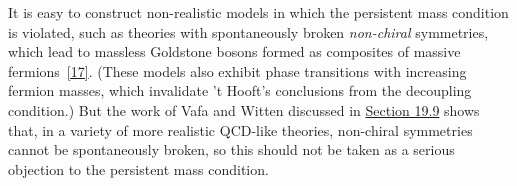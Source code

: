 It is easy to construct non-realistic models in which the persistent mass
condition is violated, such as theories with spontaneously broken
\emph{non-chiral} symmetries, which lead to massless Goldstone bosons formed
as composites of massive fermions~\hyperref[ch22-ref-17]{[17]}. (These
models also exhibit phase transitions with increasing fermion masses,
which invalidate 't Hooft's conclusions from the decoupling condition.)
But the work of Vafa and Witten discussed in
\hyperref[sec:19.9]{Section 19.9} shows that, in a variety of more realistic
QCD-like theories, non-chiral symmetries cannot be spontaneously broken,
so this should not be taken as a serious objection to the persistent mass
condition.
